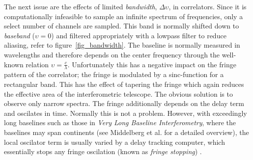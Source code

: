 \documentclass[a4paper,10pt]{report}
\begin{document}
The next issue are the effects of limited \textit{bandwidth}, $\Delta\upsilon$, in correlators. Since it is computationally infeasible to sample an infinite spectrum of frequencies, only a select number of channels are sampled. This
band is normally shifted down to \textit{baseband} ($\upsilon=0$) and filtered appropriately with a lowpass filter to reduce aliasing, refer to figure~\ref{fig_bandwidth}. The baseline is normally measured in wavelengths and therefore depends on the
center frequency through the well-known relation $\upsilon=\frac{c}{\lambda}$. Unfortunately this has a negative impact on the fringe pattern of the correlator; the fringe is modulated by a sinc-function for a rectangular band. This has
the effect of tapering the fringe which again reduces the effective area of the interferometric telescope. The obvious solution is to observe only narrow spectra. The fringe additionally depends on the delay term and oscilates in time. Normally this is not a problem. However, with exceedingly long baselines such as those in \textit{Very Long Baseline Interferometry}, where the baselines may span continents (see Middelberg et al. \cite{middelberg2008high} for a detailed overview), the local oscilator term is usually varied 
by a delay tracking computer, which essentially stops any fringe oscilation (known as \textit{fringe stopping}) \cite{taylor1999synthesis}.
\end{document}
